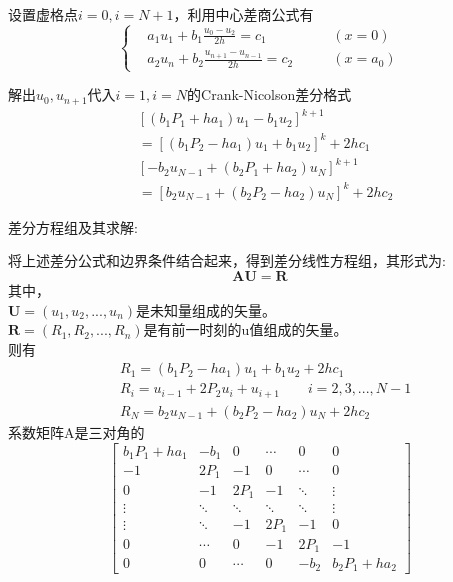 \documentclass[twoside,twocolumn]{article}
\begin{document}
\begin{CJK*}{UTF8}{gkai}
设置虚格点$i=0,i=N+1$，利用中心差商公式有
\begin{equation*}
\left\{
\begin{aligned}
&a_{1}u_{1}+b_{1}\frac{u_{0}-u_{2}}{2h}=c_{1}\qquad &(x=0)\\
&a_{2}u_{n}+b_{2}\frac{u_{n+1}-u_{n-1}}{2h}=c_{2}\qquad &(x=a_{0})
\end{aligned}
\right.
\end{equation*}

解出$u_{0},u_{n+1}$代入$i=1,i=N$的Crank-Nicolson差分格式
\begin{equation*}
\begin{aligned}
&\left[\left(b_{1}P_{1}+ha_{1}\right)u_{1}-b_{1}u_{2}\right]^{k+1}\\
&=\left[\left(b_{1}P_{2}-ha_{1}\right)u_{1}+b_{1}u_{2}\right]^{k}+2hc_{1}\\
&\left[-b_{2}u_{N-1}+\left(b_{2}P_{1}+ha_{2}\right)u_{N}\right]^{k+1}\\
&=\left[b_{2}u_{N-1}+\left(b_{2}P_{2}-ha_{2}\right)u_{N}\right]^{k}+2hc_{2}
\end{aligned}
\end{equation*}

差分方程组及其求解:

将上述差分公式和边界条件结合起来，得到差分线性方程组，其形式为:
\begin{equation*}
\mathbf{AU}=\mathbf{R}
\end{equation*}
其中，\\
$\mathbf{U}=(u_{1},u_{2},...,u_{n})$是未知量组成的矢量。\\
$\mathbf{R}=(R_{1},R_{2},...,R_{n})$是有前一时刻的u值组成的矢量。\\

则有
\begin{equation*}
\begin{aligned}
&R_{1}=(b_{1}P_{2}-ha_{1})u_{1}+b_{1}u_{2}+2hc_{1}\\
&R_{i}=u_{i-1}+2P_{2}u_{i}+u_{i+1}\qquad i=2,3,...,N-1\\
&R_{N}=b_{2}u_{N-1}+(b_{2}P_{2}-ha_{2})u_{N}+2hc_{2}
\end{aligned}
\end{equation*}
系数矩阵A是三对角的
\begin{equation*}
\begin{bmatrix} 
b_ {1}P_{1}+ha_{1}&-b_{1}&0&\cdots&0&0\\
-1&2P_{1}&-1&0&\cdots&0\\
0&-1&2P_{1}&-1&\ddots&\vdots\\
\vdots&\ddots&\ddots&\ddots&\ddots&\vdots\\
\vdots&\ddots&-1&2P_{1}&-1&0\\
0&\cdots&0&-1&2P_{1}&-1\\
0&0&\cdots&0&-b_{2}&b_{2}P_{1}+ha_{2}
\end{bmatrix}
\end{equation*}


\end{CJK*}
\end{document}
